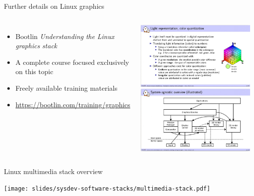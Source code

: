 \begin{frame}{Further details on Linux graphics}
  \begin{columns}
    \begin{itemize}
    \item Bootlin {\em Understanding the Linux graphics stack}
    \item A complete course focused exclusively on this topic
    \item Freely available training materials
    \item \url{https://bootlin.com/training/graphics}
    \end{itemize}
    \includegraphics[width=\textwidth]{slides/sysdev-software-stacks/linux-graphics-course-slide1.jpg}
    \includegraphics[width=\textwidth]{slides/sysdev-software-stacks/linux-graphics-course-slide2.jpg}
  \end{columns}
\end{frame}

\begin{frame}{Linux multimedia stack overview}
  \begin{center}
    \texttt{[image: slides/sysdev-software-stacks/multimedia-stack.pdf]}
  \end{center}
\end{frame}

